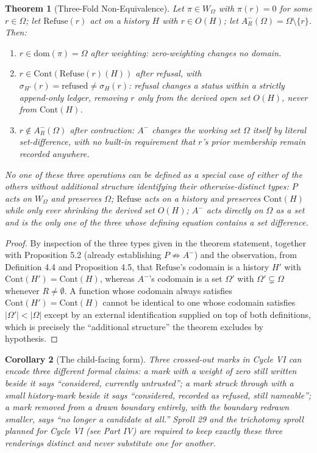 \documentclass[11pt,twoside]{book}
\newtheorem{theorem}{Theorem}[chapter]
\newtheorem{corollary}[theorem]{Corollary}
\begin{document}
\begin{theorem}[Three-Fold Non-Equivalence]
Let $\pi \in W_\Omega$ with $\pi(r) = 0$ for some $r \in \Omega$; let $\mathrm{Refuse}(r)$ act on a history $H$ with $r \in O(H)$; let $A_R^-(\Omega) = \Omega \setminus \{r\}$. Then:
\begin{enumerate}
\item $r \in \mathrm{dom}(\pi)= \Omega$ after weighting: zero-weighting changes no domain.
\item $r \in \mathrm{Cont}(\mathrm{Refuse}(r)(H))$ after refusal, with $\sigma_{H'}(r) = \mathrm{refused} \neq \sigma_H(r)$: refusal changes a status within a strictly append-only ledger, removing $r$ only from the derived open set $O(H)$, never from $\mathrm{Cont}(H)$.
\item $r \notin A_R^-(\Omega)$ after contraction: $A^-$ changes the working set $\Omega$ itself by literal set-difference, with no built-in requirement that $r$'s prior membership remain recorded anywhere.
\end{enumerate}
No one of these three operations can be defined as a special case of either of the others without additional structure identifying their otherwise-distinct types: $P$ acts on $W_\Omega$ and preserves $\Omega$; $\mathrm{Refuse}$ acts on a history and preserves $\mathrm{Cont}(H)$ while only ever shrinking the derived set $O(H)$; $A^-$ acts directly on $\Omega$ as a set and is the only one of the three whose defining equation contains a set difference.
\end{theorem}

\begin{proof}
By inspection of the three types given in the theorem statement, together with Proposition 5.2 (already establishing $P \not\Rightarrow A^-$) and the observation, from Definition 4.4 and Proposition 4.5, that $\mathrm{Refuse}$'s codomain is a history $H'$ with $\mathrm{Cont}(H') = \mathrm{Cont}(H)$, whereas $A^-$'s codomain is a set $\Omega'$ with $\Omega' \subsetneq \Omega$ whenever $R \neq \emptyset$. A function whose codomain always satisfies $\mathrm{Cont}(H') = \mathrm{Cont}(H)$ cannot be identical to one whose codomain satisfies $|\Omega'| < |\Omega|$ except by an external identification supplied on top of both definitions, which is precisely the ``additional structure'' the theorem excludes by hypothesis.
\end{proof}

\begin{corollary}[The child-facing form]
Three crossed-out marks in Cycle VI can encode three different formal claims: a mark with a weight of zero still written beside it says ``considered, currently untrusted''; a mark struck through with a small history-mark beside it says ``considered, recorded as refused, still nameable''; a mark removed from a drawn boundary entirely, with the boundary redrawn smaller, says ``no longer a candidate at all.'' Sproll 29 and the trichotomy sproll planned for Cycle VI (see Part IV) are required to keep exactly these three renderings distinct and never substitute one for another.
\end{corollary}
\end{document}

